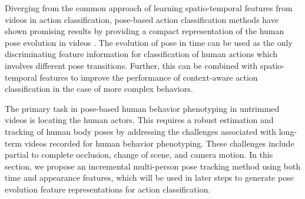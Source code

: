 \PoseNet
Diverging from the common approach of learning spatio-temporal features from videos in action classification, pose-based action classification methods have shown promising results by providing a compact representation of the human pose evolution in videos \cite{cherian2018non, choutas2018potion, liu2018recognizing, zolfaghari2017chained}. The evolution of pose in time can be used as the only discriminating feature information for classification of human actions which involves different pose transitions. Further, this can be combined with spatio-temporal features to improve the performance of context-aware action classification in the case of more complex behaviors.

The primary task in pose-based human behavior phenotyping in untrimmed videos is locating the human actors. This requires a robust estimation and tracking of human body poses by addressing the challenges associated with long-term videos recorded for human behavior phenotyping. These challenges include partial to complete occlusion, change of scene, and camera motion. In this section, we propose an incremental multi-person pose tracking method using both time and appearance features, which will be used in later steps to generate pose evolution feature representations for action classification.